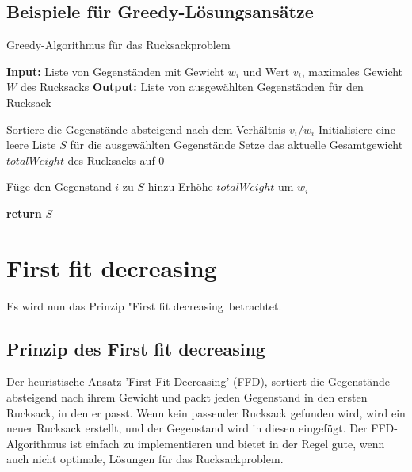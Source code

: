 \documentclass[12pt]{report}
\begin{document}
\section{Beispiele für Greedy-Lösungsansätze}
\begin{algorithm}
	\caption{Greedy-Algorithmus für das Rucksackproblem}
	\begin{algorithmic}[1]
		\State \textbf{Input:} Liste von Gegenständen mit Gewicht $w_i$ und Wert $v_i$, maximales Gewicht $W$ des Rucksacks
		\State \textbf{Output:} Liste von ausgewählten Gegenständen für den Rucksack
		
		\State Sortiere die Gegenstände absteigend nach dem Verhältnis $v_i/w_i$
		\State Initialisiere eine leere Liste $S$ für die ausgewählten Gegenstände
		\State Setze das aktuelle Gesamtgewicht $totalWeight$ des Rucksacks auf $0$
		
		\State Füge den Gegenstand $i$ zu $S$ hinzu
		\State Erhöhe $totalWeight$ um $w_i$
		\EndIf
		\EndFor
		
		\State \textbf{return} $S$
	\end{algorithmic}
\end{algorithm}


\newpage
\chapter{First fit decreasing}
Es wird nun das Prinzip "First fit decreasing\dq \, betrachtet.
\section{Prinzip des First fit decreasing}
Der heuristische Ansatz 'First Fit Decreasing' (FFD), sortiert die Gegenstände absteigend nach ihrem Gewicht und packt jeden Gegenstand in den ersten Rucksack, in den er passt. Wenn kein passender Rucksack gefunden wird, wird ein neuer Rucksack erstellt, und der Gegenstand wird in diesen eingefügt. Der FFD-Algorithmus ist einfach zu implementieren und bietet in der Regel gute, wenn auch nicht optimale, Lösungen für das Rucksackproblem. \cite{martello1987algorithms}
\end{document}
